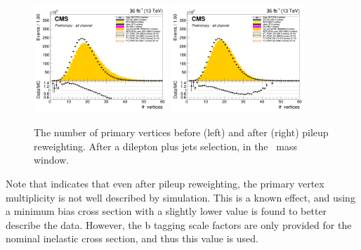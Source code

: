\begin{figure}[htbp]
	\centering	
	\includegraphics[width=0.45\textwidth]{5_Eventselection/Figures/Reweighing/pileup/2lepcontrol_afterAtLeast1Jet_afterZWindow_NbOfVertices_all_Stack_before}
	\includegraphics[width=0.45\textwidth]{5_Eventselection/Figures/Reweighing/pileup/2lepcontrol_afterAtLeast1Jet_afterZWindow_NbOfVertices_all_Stack}
	\caption{The number of primary vertices before (left) and after (right) pileup reweighting. After a dilepton plus jets selection, in the \PZ\ mass window.}
	\label{fig:nbvertices}
\end{figure}

Note that  indicates that even after pileup reweighting, the primary vertex multiplicity is not well described by simulation. This is a known effect, and using  a minimum bias cross section with a slightly lower value is found to better describe the data. However, the b tagging scale factors are only provided for the nominal inelastic cross section, and thus this value is used.


